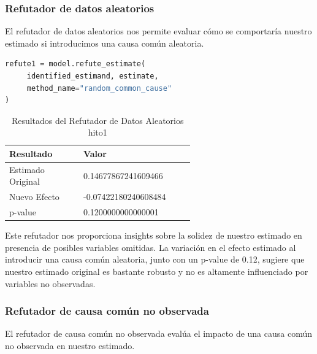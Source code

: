 \subsubsection{Refutador de datos aleatorios}

El refutador de datos aleatorios nos permite evaluar cómo se comportaría nuestro estimado si introducimos una causa común aleatoria.

\begin{minipage}{0.5\textwidth}
    \begin{lstlisting}[language=Python, caption=Refutador de datos aleatorios hito1, label=lst:RefutadorDatosAleatoriosHito1]
refute1 = model.refute_estimate(
     identified_estimand, estimate, 
     method_name="random_common_cause"
)
\end{lstlisting}
\end{minipage}
\hfill
\begin{minipage}{0.45\textwidth}
    \begin{table}[H]
        \centering        
        \begin{tabular}{lp{0.6\linewidth}}
            \toprule
            \textbf{Resultado} & \textbf{Valor} \\
            \midrule
            Estimado Original & 0.14677867241609466 \\
            Nuevo Efecto & -0.07422180240608484 \\
            p-value & 0.1200000000000001 \\
            \bottomrule
        \end{tabular}
        \caption{Resultados del Refutador de Datos Aleatorios hito1}
        \label{tab:refutador_datos_aleatorios_hito1}
    \end{table}
\end{minipage}

Este refutador nos proporciona insights sobre la solidez de nuestro estimado en presencia de posibles variables omitidas. La variación en el efecto estimado al introducir una causa común aleatoria, junto con un p-value de 0.12, sugiere que nuestro estimado original es bastante robusto y no es altamente influenciado por variables no observadas.

\subsubsection{Refutador de causa común no observada}

El refutador de causa común no observada evalúa el impacto de una causa común no observada en nuestro estimado.

